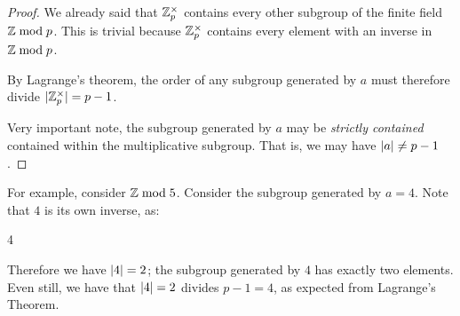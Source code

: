 \begin{proof}
  We already said that $\mathbb{Z}_p^\times$ contains every other subgroup of the
  finite field $\mathbb{Z} \bmod p$. This is trivial because $\mathbb{Z}_p^\times$ contains
  every element with an inverse in $\mathbb{Z} \bmod p$.

  By Lagrange's theorem, the order of any subgroup generated by $a$ must
  therefore divide $|\mathbb{Z}_p^\times| = p - 1$.

  Very important note, the subgroup generated by $a$ may be
  \emph{strictly contained} contained within the multiplicative
  subgroup. That is, we may have $|a| \ne p - 1$.
\end{proof}

\begin{example}
  For example, consider $\mathbb{Z} \bmod 5$. Consider the subgroup generated by
  $a = 4$. Note that $4$ is its own inverse, as:

  \begin{nedqn}
    4 
  \\ 
  \end{nedqn}

  Therefore we have $|4| = 2$; the subgroup generated by $4$ has
  exactly two elements. Even still, we have that $|4| = 2$ divides
  $p - 1= 4$, as expected from Lagrange's Theorem.
\end{example}

